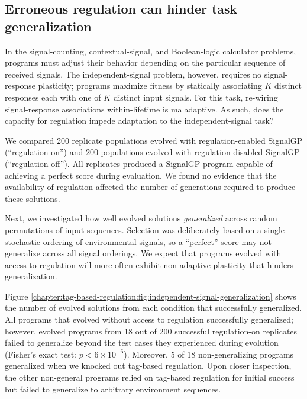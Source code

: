 \subsection{Erroneous regulation can hinder task generalization}

In the signal-counting, contextual-signal, and Boolean-logic calculator problems, programs must adjust their behavior depending on the particular sequence of received signals.
The independent-signal problem, however, requires no signal-response plasticity; programs maximize fitness by statically associating $K$ distinct responses each with one of $K$ distinct input signals.
For this task, re-wiring signal-response associations within-lifetime is maladaptive.
As such, does the capacity for regulation impede adaptation to the independent-signal task?

We compared 200 replicate populations evolved with regulation-enabled SignalGP (``regulation-on'') and 200 populations evolved with regulation-disabled SignalGP (``regulation-off'').
All replicates produced a SignalGP program capable of achieving a perfect score during evaluation. 
We found no evidence that the availability of regulation affected the number of generations required to produce these solutions.

Next, we investigated how well evolved solutions \textit{generalized} across random permutations of input sequences.
Selection was deliberately based on a single stochastic ordering of environmental signals, so a ``perfect'' score may not generalize across all signal orderings.
We expect that programs evolved with access to regulation will more often exhibit non-adaptive plasticity that hinders generalization.

Figure \ref{chapter:tag-based-regulation:fig:independent-signal-generalization} shows the number of evolved solutions from each condition that successfully generalized.
All programs that evolved without access to regulation successfully generalized; however, evolved programs from 18 out of 200 successful regulation-on replicates failed to generalize beyond the test cases they experienced during evolution (Fisher's exact test: $p < 6\times10^{-6}$).
Moreover, 5 of 18 non-generalizing programs generalized when we knocked out tag-based regulation.
Upon closer inspection, the other non-general programs relied on tag-based regulation for initial success but failed to generalize to arbitrary environment sequences.




